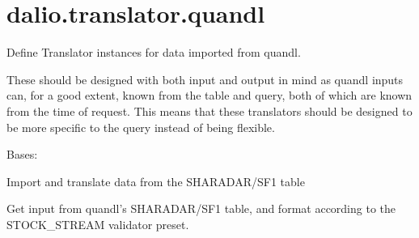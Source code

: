 \documentclass[letterpaper,10pt,english]{sphinxmanual}
\begin{document}
\section{dalio.translator.quandl}
\label{\detokenize{dalio.translator:module-dalio.translator.quandl}}\label{\detokenize{dalio.translator:dalio-translator-quandl}}
Define Translator instances for data imported from quandl.

These should be designed with both input and output in mind as quandl inputs
can, for a good extent, known from the table and query, both of which are
known from the time of request. This means that these translators should be
designed to be more specific to the query instead of being flexible.

\begin{fulllineitems}
\label{\detokenize{dalio.translator:dalio.translator.quandl.QuandlSharadarSF1Translator}}
Bases: {\hyperref[\detokenize{dalio.translator:dalio.translator.translator.Translator}]{}}

Import and translate data from the SHARADAR/SF1 table

\begin{fulllineitems}
\label{\detokenize{dalio.translator:dalio.translator.quandl.QuandlSharadarSF1Translator.run}}
Get input from quandl’s SHARADAR/SF1 table, and format
according to the STOCK\_STREAM validator preset.

\end{fulllineitems}


\begin{fulllineitems}
\label{\detokenize{dalio.translator:dalio.translator.quandl.QuandlSharadarSF1Translator.translations}}
\end{fulllineitems}


\end{fulllineitems}
\end{document}
